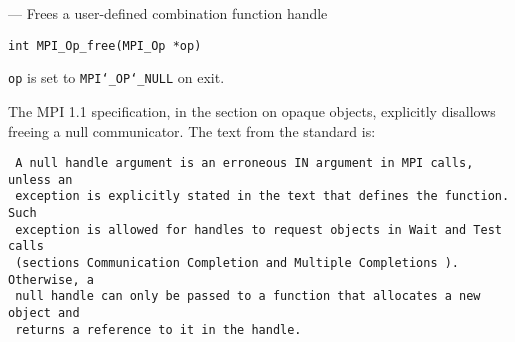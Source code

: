 \startmanpage
{}
--- Frees a user-defined combination function handle 
\startvb\begin{verbatim}
int MPI_Op_free(MPI_Op *op)

\end{verbatim}
\endvb

\par
{}
{\tt op} is set to {\tt MPI{\tt \char`\_}OP{\tt \char`\_}NULL} on exit.
\par
{}
The MPI 1.1 specification, in the section on opaque objects, explicitly
disallows freeing a null communicator.  The text from the standard is:
\begin{verbatim}
 A null handle argument is an erroneous IN argument in MPI calls, unless an
 exception is explicitly stated in the text that defines the function. Such
 exception is allowed for handles to request objects in Wait and Test calls
 (sections Communication Completion and Multiple Completions ). Otherwise, a
 null handle can only be passed to a function that allocates a new object and
 returns a reference to it in the handle.
\end{verbatim}

